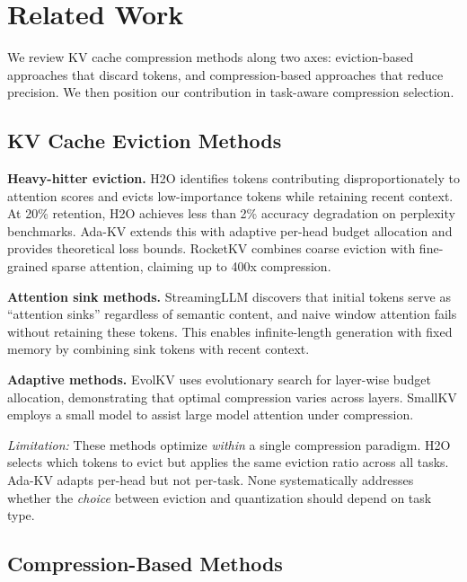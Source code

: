 \section{Related Work}

We review KV cache compression methods along two axes: eviction-based approaches that discard tokens, and compression-based approaches that reduce precision. We then position our contribution in task-aware compression selection.

\subsection{KV Cache Eviction Methods}

\textbf{Heavy-hitter eviction.} H2O \citep{zhang2023h2o} identifies tokens contributing disproportionately to attention scores and evicts low-importance tokens while retaining recent context. At 20\% retention, H2O achieves less than 2\% accuracy degradation on perplexity benchmarks. Ada-KV \citep{feng2024adakv} extends this with adaptive per-head budget allocation and provides theoretical loss bounds. RocketKV \citep{behnam2025rocketkv} combines coarse eviction with fine-grained sparse attention, claiming up to 400x compression.

\textbf{Attention sink methods.} StreamingLLM \citep{xiao2023streamingllm} discovers that initial tokens serve as ``attention sinks'' regardless of semantic content, and naive window attention fails without retaining these tokens. This enables infinite-length generation with fixed memory by combining sink tokens with recent context.

\textbf{Adaptive methods.} EvolKV \citep{yu2025evolkv} uses evolutionary search for layer-wise budget allocation, demonstrating that optimal compression varies across layers. SmallKV \citep{zhao2025smallkv} employs a small model to assist large model attention under compression.

\emph{Limitation:} These methods optimize \emph{within} a single compression paradigm. H2O selects which tokens to evict but applies the same eviction ratio across all tasks. Ada-KV adapts per-head but not per-task. None systematically addresses whether the \emph{choice} between eviction and quantization should depend on task type.

\subsection{Compression-Based Methods}

